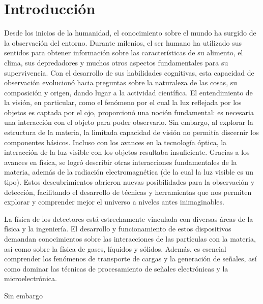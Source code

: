\documentclass[]{book}
\begin{document}
\chapter{Introducción}
Desde los inicios de la humanidad, el conocimiento sobre el mundo ha surgido de la observación del entorno. 
Durante milenios, el ser humano ha utilizado sus sentidos para obtener información sobre las características 
de su alimento, el clima, sus depredadores y muchos otros aspectos fundamentales para su supervivencia. 
Con el desarrollo de sus habilidades cognitivas, esta capacidad de observación evolucionó hacia preguntas
sobre la naturaleza de las cosas, su composición y origen, dando lugar a la actividad científica.
El entendimiento de la visión, en particular, como el fenómeno por el cual la luz reflejada por los objetos 
es captada por el ojo, proporcionó una noción fundamental: es necesaria una interacción con el objeto para 
poder observarlo. Sin embargo, al explorar la estructura de la materia, la limitada capacidad de visión no 
permitía discernir los componentes básicos. Incluso con los avances en la tecnología óptica, la interacción
de la luz visible con los objetos resultaba insuficiente.
Gracias a los avances en física, se logró describir otras interacciones fundamentales de la materia, además 
de la radiación electromagnética (de la cual la luz visible es un tipo). Estos descubrimientos abrieron nuevas
posibilidades para la observación y detección, facilitando el desarrollo de técnicas y herramientas que nos 
permiten explorar y comprender mejor el universo a niveles antes inimaginables.

La física de los detectores está estrechamente vinculada con diversas áreas de la física y la ingeniería. 
El desarrollo y funcionamiento de estos dispositivos demandan conocimientos sobre las interacciones de las 
partículas con la materia, así como sobre la física de gases, líquidos y sólidos. Además, es esencial comprender 
los fenómenos de transporte de cargas y la generación de señales, así como dominar las técnicas de procesamiento 
de señales electrónicas y la microelectrónica.

Sin embargo
\end{document}

